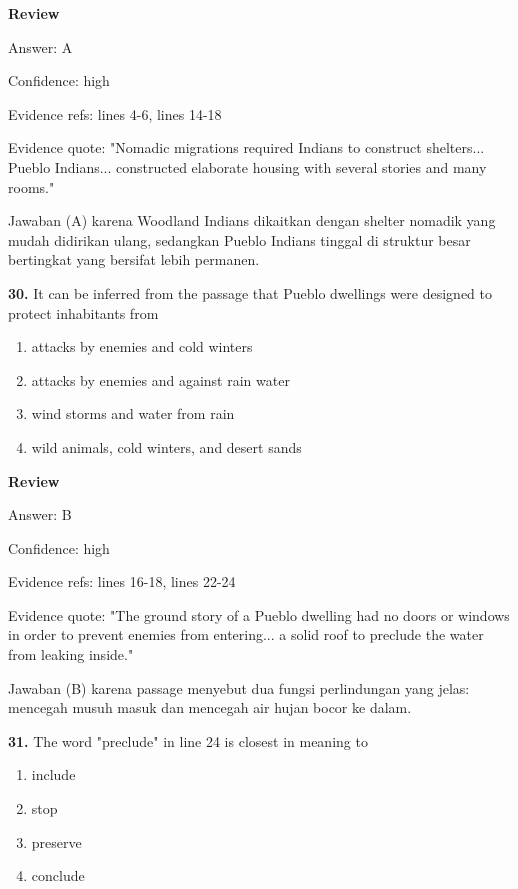 \documentclass[12pt]{article}
\begin{document}
\par
\begingroup
\setlength{\parskip}{0pt}
\setlength{\parindent}{0pt}
\textbf{Review}\par
Answer: A\par
Confidence: high\par
Evidence refs: lines 4-6, lines 14-18\par
Evidence quote: "Nomadic migrations required Indians to construct shelters... Pueblo Indians... constructed elaborate housing with several stories and many rooms."\par
Jawaban (A) karena Woodland Indians dikaitkan dengan shelter nomadik yang mudah didirikan ulang, sedangkan Pueblo Indians tinggal di struktur besar bertingkat yang bersifat lebih permanen.\par
\endgroup
\par
\vspace{0.25\baselineskip}
\noindent\textbf{30.} It can be inferred from the passage that Pueblo dwellings were designed to protect inhabitants from
\begin{enumerate}[label=(\Alph*),leftmargin=*,itemsep=0.2em]
\item attacks by enemies and cold winters
\item attacks by enemies and against rain water
\item wind storms and water from rain
\item wild animals, cold winters, and desert sands
\end{enumerate}
\par
\begingroup
\setlength{\parskip}{0pt}
\setlength{\parindent}{0pt}
\textbf{Review}\par
Answer: B\par
Confidence: high\par
Evidence refs: lines 16-18, lines 22-24\par
Evidence quote: "The ground story of a Pueblo dwelling had no doors or windows in order to prevent enemies from entering... a solid roof to preclude the water from leaking inside."\par
Jawaban (B) karena passage menyebut dua fungsi perlindungan yang jelas: mencegah musuh masuk dan mencegah air hujan bocor ke dalam.\par
\endgroup
\par
\vspace{0.25\baselineskip}
\noindent\textbf{31.} The word "preclude" in line 24 is closest in meaning to
\begin{enumerate}[label=(\Alph*),leftmargin=*,itemsep=0.2em]
\item include
\item stop
\item preserve
\item conclude
\end{enumerate}
\end{document}
